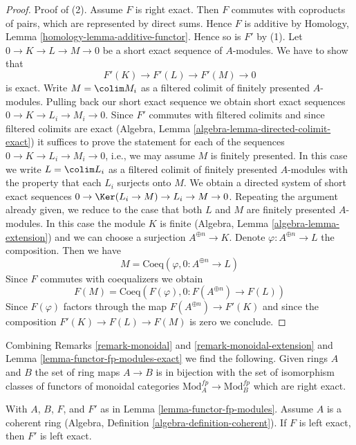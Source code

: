 \begin{proof}
\medskip\noindent
Proof of (2). Assume $F$ is right exact.
Then $F$ commutes with coproducts of pairs, which are
represented by direct sums. Hence $F$ is additive by
Homology, Lemma \ref{homology-lemma-additive-functor}.
Hence so is $F'$ by (1). Let $0 \to K \to L \to M \to 0$
be a short exact sequence of $A$-modules. We have to show that
$$
F'(K) \to F'(L) \to F'(M) \to 0
$$
is exact. Write $M = \colim M_i$ as a filtered colimit of finitely
presented $A$-modules. Pulling back our short exact sequence
we obtain short exact sequences $0 \to K \to L_i \to M_i \to 0$.
Since $F'$ commutes with filtered colimits and since
filtered colimits are exact
(Algebra, Lemma \ref{algebra-lemma-directed-colimit-exact})
it suffices to prove the statement for each of the sequences
$0 \to K \to L_i \to M_i \to 0$, i.e., we may assume $M$
is finitely presented. In this case we write $L = \colim L_i$
as a filtered colimit of finitely presented $A$-modules
with the property that each $L_i$ surjects onto $M$.
We obtain a directed system of short exact sequences
$0 \to \Ker(L_i \to M) \to L_i \to M \to 0$.
Repeating the argument already given, we reduce to the case that both
$L$ and $M$ are finitely presented $A$-modules.
In this case the module $K$ is finite
(Algebra, Lemma \ref{algebra-lemma-extension})
and we can choose a surjection $A^{\oplus n} \to K$.
Denote $\varphi : A^{\oplus n} \to L$ the composition.
Then we have
$$
M = \text{Coeq}(\varphi, 0 : A^{\oplus n} \to L)
$$
Since $F$ commutes with coequalizers we obtain
$$
F(M) = \text{Coeq}(F(\varphi), 0 : F(A^{\oplus n}) \to F(L))
$$
Since $F(\varphi)$ factors through the map
$F(A^{\oplus n}) \to F'(K)$
and since the composition $F'(K) \to F(L) \to F(M)$ is zero
we conclude.
\end{proof}

\begin{remark}
\label{remark-monoidal-extension-exact}
Combining Remarks \ref{remark-monoidal} and \ref{remark-monoidal-extension}
and Lemma \ref{lemma-functor-fp-modules-exact}
we find the following. Given rings $A$ and $B$ the set of ring maps $A \to B$
is in bijection with the set of isomorphism classes
of functors of monoidal categories $\text{Mod}^{fp}_A \to \text{Mod}^{fp}_B$
which are right exact.
\end{remark}

\begin{lemma}
\label{lemma-functor-fp-modules-left-exact}
With $A$, $B$, $F$, and $F'$ as in Lemma \ref{lemma-functor-fp-modules}.
Assume $A$ is a coherent ring
(Algebra, Definition \ref{algebra-definition-coherent}).
If $F$ is left exact, then $F'$ is left exact.
\end{lemma}

